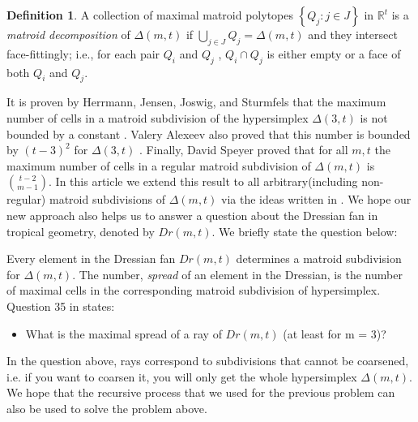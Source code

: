 \documentclass[12pt, reqno]{amsart}
\theoremstyle{definition}
\newtheorem{definition}[theorem]{Definition}
\theoremstyle{remark}
\numberwithin{equation}{section}
\begin{document}



\begin{definition}
	A collection of maximal matroid polytopes $\left\{Q_j: j\in J\right\}$ in $\mathbb{R}^t$ is a \emph{matroid decomposition} of $\Delta(m,t)$
	if $\bigcup\limits_{j\in J} Q_j=\Delta(m,t)$ and they intersect face-fittingly; i.e., for each  pair  $Q_i$ and $Q_j$ , $Q_i\cap Q_j$ is either empty or a face of both $Q_i$ and $Q_j$.
\end{definition}




It is proven by 
Herrmann,  Jensen, Joswig, and Sturmfels
that 
the maximum number of  cells in a matroid subdivision of the hypersimplex
$\Delta(3,t)$ is   not bounded by a constant \cite{Tropical}.  Valery Alexeev also proved that 
this number is bounded by $(t-3)^2$  for $\Delta(3,t)$ \cite{Alex}. 
Finally, David Speyer proved that for all $m,t$   
the maximum number of  cells in a regular matroid subdivision of 
$\Delta(m,t)$
is
$\binom{t-2}{m-1}$.
 In this article we extend this
result to all arbitrary(including non-regular)  matroid subdivisions of 
$\Delta(m,t)$ via the ideas written in 
\cite{HHH}. We hope our new approach also helps us to answer a question about  the Dressian fan  in tropical geometry, denoted by $Dr(m,t)$. We briefly state the question below:

 Every element in the Dressian fan
 $Dr(m,t)$ determines a matroid subdivision for
 $\Delta(m,t)$. The number, \emph{spread} of an element in the Dressian, is the 
 number of maximal cells in the corresponding matroid subdivision of hypersimplex. Question 35 in \cite{Dressian} states:
 \begin{itemize}
 	\item 
 What is the maximal spread of a ray of $Dr(m,t)$ (at least for m = 3)?
   \end{itemize}
  
  
  In the question above, rays  correspond to  subdivisions that
  cannot be coarsened, i.e. 
  if you want to coarsen it, you will only get the whole hypersimplex $\Delta(m,t)$.
  We hope that the recursive process that we used for the previous problem can also be used to solve the problem above.
  
\end{document}
